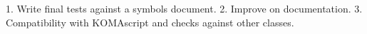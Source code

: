 1. Write final tests against a symbols document.
2. Improve on documentation.
3. Compatibility with KOMAscript and checks against other classes.
